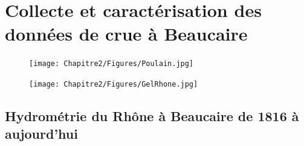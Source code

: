 %
% 
%
%
%
%
%
%


\chapter{Collecte et caractérisation des données de crue à Beaucaire}
\label{chap:ch2}


	\begin{figure}[h]
	\centering
		\texttt{[image: Chapitre2/Figures/Poulain.jpg]}
	\end{figure}
	
	\begin{figure}[h]
	\centering
		\texttt{[image: Chapitre2/Figures/GelRhone.jpg]}	
	\end{figure}

\FloatBarrier
\newpage

\section{Hydrométrie du Rhône à Beaucaire de 1816 à aujourd'hui}
\label{sec:hydrometrie}

